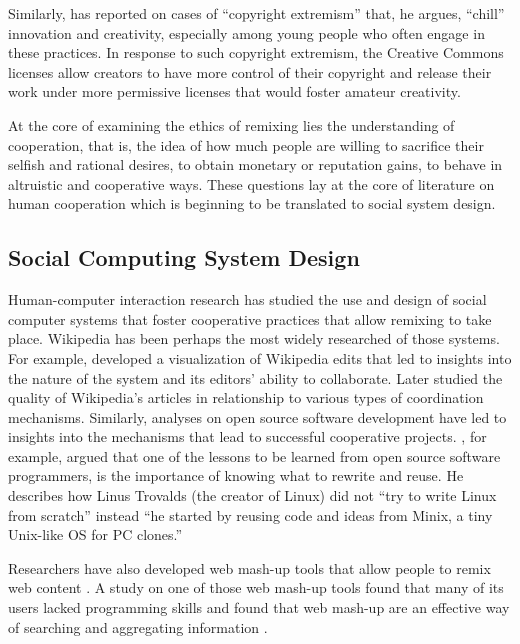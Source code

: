 Similarly, \citet{lessig_remix:_2008} has reported on cases of ``copyright extremism'' that, he argues, ``chill''
 innovation and creativity, especially among young people who often engage in these practices.
In response to such copyright extremism, the Creative Commons licenses allow creators to have more control of their copyright and release their work under more permissive licenses that would foster amateur creativity.

At the core of examining the ethics of remixing lies the understanding of cooperation, that is, the idea of how much people are willing to sacrifice their selfish and rational desires, to obtain monetary or reputation gains, to behave in altruistic and cooperative ways. 
These questions lay at the core of literature on human cooperation which is beginning to be translated to social system design.

\subsection{Social Computing System Design}

Human-computer interaction research has studied the use and design of social computer systems that foster cooperative practices that allow remixing to take place.
Wikipedia has been perhaps the most widely researched of those systems. 
For example, \citet{viegas_studying_2004} developed a visualization of Wikipedia edits that led to insights into the nature of the system and its editors' ability to collaborate. 
Later \citet{kittur_harnessing_2008} studied the quality of Wikipedia's articles in relationship to various types of coordination mechanisms.
Similarly, analyses on open source software development have led to insights into the mechanisms that lead to successful cooperative projects. 
\citet{raymond_cathedral_1999}, for example, argued that one of the lessons to be learned from open source software programmers, is the importance of knowing what to rewrite and reuse. 
He describes how Linus Trovalds (the creator of Linux) did not ``try to write Linux from scratch'' instead ``he started by reusing code and ideas from Minix, a tiny Unix-like OS for PC clones.'' 

Researchers have also developed web mash-up tools that allow people to remix web content \citep{bolin_automation_2005,wong_making_2007}.
A study on one of those web mash-up tools found that many of its users lacked programming skills and found that web mash-up are an effective way of searching and aggregating information \citep{nan_zang_whats_2008}.

